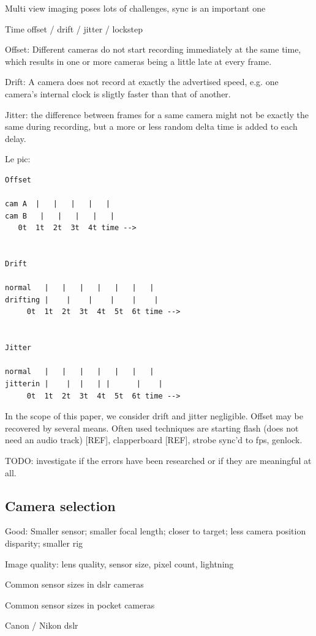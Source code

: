 Multi view imaging poses lots of challenges, sync is an important one

Time offset / drift / jitter / lockstep

Offset: Different cameras do not start recording immediately at the same time, which results in one or more cameras being a little late at every frame.

Drift: A camera does not record at exactly the advertised speed, e.g. one camera's internal clock is sligtly faster than that of another.

Jitter: the difference between frames for a same camera might not be exactly the same during recording, but a more or less random delta time is added to each delay.

Le pic:

\begin{verbatim}
Offset

cam A  |   |   |   |   |
cam B   |   |   |   |   |
   0t  1t  2t  3t  4t time -->


Drift

normal   |   |   |   |   |   |   |
drifting |    |    |    |    |    |
	 0t  1t  2t  3t  4t  5t  6t time -->


Jitter

normal   |   |   |   |   |   |   |
jitterin |    |  |   | |      |    |
	 0t  1t  2t  3t  4t  5t  6t time -->
\end{verbatim}

In the scope of this paper, we consider drift and jitter negligible.
Offset may be recovered by several means.
Often used techniques are starting flash (does not need an audio track) [REF], clapperboard [REF], strobe sync'd to fps, genlock.

TODO: investigate if the errors have been researched or if they are meaningful at all.


\subsection{Camera selection}

Good: Smaller sensor; smaller focal length; closer to target; less camera position disparity; smaller rig

Image quality: lens quality, sensor size, pixel count, lightning

Common sensor sizes in dslr cameras

Common sensor sizes in pocket cameras

Canon / Nikon dslr

